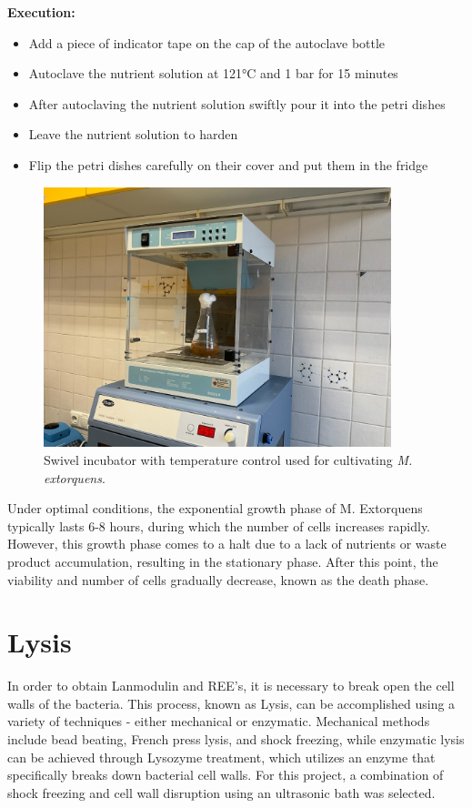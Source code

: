 \textbf{Execution:}
\begin{itemize}
    \item Add a piece of indicator tape on the cap of the autoclave bottle
    \item Autoclave the nutrient solution at 121°C and 1 bar for 15 minutes
    \item After autoclaving the nutrient solution swiftly pour it into the petri dishes
    \item Leave the nutrient solution to harden
    \item Flip the petri dishes carefully on their cover and put them in the fridge
\end{itemize}

\begin{figure}[H]
    \centering
    \includegraphics[width=0.9\textwidth]{./media/images/swivel_incubator}
    \caption{Swivel incubator with temperature control used for cultivating \emph{M. extorquens}.}
    \label{fig:swivel_incubator}
\end{figure}

Under optimal conditions, the exponential growth phase of M. Extorquens typically lasts
6-8 hours, during which the number of cells increases rapidly. However, this growth
phase comes to a halt due to a lack of nutrients or waste product accumulation, resulting
in the stationary phase. After this point, the viability and number of cells gradually
decrease, known as the death phase.


\section{Lysis}\label{sec:me_lysis}
In order to obtain Lanmodulin and REE's, it is necessary to break open the cell walls of
the bacteria. This process, known as Lysis, can be accomplished using a variety of
techniques - either mechanical or enzymatic. Mechanical methods include bead beating,
French press lysis, and shock freezing, while enzymatic lysis can be achieved through
Lysozyme treatment, which utilizes an enzyme that specifically breaks down bacterial cell
walls. For this project, a combination of shock freezing and cell wall disruption using an
ultrasonic bath was selected.



